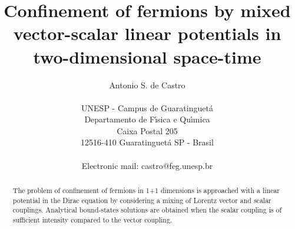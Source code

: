 \documentclass[a4paper,12pt,titlepage]{article}
\begin{document}
\title{Confinement of fermions by mixed vector-scalar linear potentials in
two-dimensional space-time}
\date{}
\author{Antonio S. de Castro \\
\\
UNESP - Campus de Guaratinguet\'{a}\\
Departamento de F\'{\i}sica e Qu\'{\i}mica\\
Caixa Postal 205\\
12516-410 Guaratinguet\'{a} SP - Brasil\\
\\
Electronic mail: castro@feg.unesp.br}
\maketitle

\begin{abstract}
The problem of confinement of fermions in 1+1 dimensions is approached with
a linear potential in the Dirac equation by considering a mixing of Lorentz
vector and scalar couplings. Analytical bound-states solutions are obtained
when the scalar coupling is of sufficient intensity compared to the vector
coupling.
\end{abstract}
\end{document}
